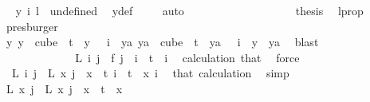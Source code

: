 \begin{isabellebody}
\ \isamarkupfalse%
\ {\isachardoublequoteopen}y\ i\ l\ {\isacharequal}{\kern0pt}\ undefined{\isachardoublequoteclose}\ \isamarkupfalse%
\ y{\isacharunderscore}{\kern0pt}def\ \isamarkupfalse%
\ {}\ \isamarkupfalse%
\ auto\isanewline
\ \ \ \ \ \ \ \ \ \ \ \ \ \ \ \ \isamarkupfalse%
\ \isamarkupfalse%
\ {\isacharquery}{\kern0pt}thesis\ \isamarkupfalse%
\ l{\isacharunderscore}{\kern0pt}prop\ \isamarkupfalse%
\ presburger\isanewline
\ \ \ \ \ \ \ \ \ \ \ \ \ \ \isamarkupfalse%
\isanewline
\ \ \ \ \ \ \ \ \ \ \ \ \isamarkupfalse%
\isanewline
\ \ \ \ \ \ \ \ \ \ \ \ \isamarkupfalse%
\ \isamarkupfalse%
\ {\isachardoublequoteopen}{\isasymexists}y{\isachardot}{\kern0pt}\ {\isacharparenleft}{\kern0pt}y\ {\isasymin}\ cube\ {}\ t\ {\isasymand}\ y\ {}\ {\isacharequal}{\kern0pt}\ i{\isacharparenright}{\kern0pt}\ {\isasymand}\ {\isacharparenleft}{\kern0pt}{\isasymforall}ya{\isachardot}{\kern0pt}\ ya\ {\isasymin}\ cube\ {}\ t\ {\isasymand}\ ya\ {}\ {\isacharequal}{\kern0pt}\ i\ {\isasymlongrightarrow}\ y\ {\isacharequal}{\kern0pt}\ ya{\isacharparenright}{\kern0pt}{\isachardoublequoteclose}\ \isamarkupfalse%
\ blast\isanewline
\isanewline
\ \ \ \ \ \ \ \ \ \ \isamarkupfalse%
\isanewline
\ \ \ \ \ \ \ \ \ \ \isamarkupfalse%
\ \isamarkupfalse%
\ {\isachardoublequoteopen}L\ i\ j\ {\isacharequal}{\kern0pt}\ f\ j{\isachardoublequoteclose}\ \ {\isachardoublequoteopen}i\ {\isacharless}{\kern0pt}\ t{\isachardoublequoteclose}\ \ i\ \isamarkupfalse%
\ calculation\ that\ \isamarkupfalse%
\ force\isanewline
\ \ \ \ \ \ \ \ \ \ \isamarkupfalse%
\ \isamarkupfalse%
\ \ {\isachardoublequoteopen}L\ i\ j\ {\isacharequal}{\kern0pt}\ L\ x\ j{\isachardoublequoteclose}\ \ {\isachardoublequoteopen}x\ {\isacharless}{\kern0pt}\ t{\isachardoublequoteclose}\ {\isachardoublequoteopen}i\ {\isacharless}{\kern0pt}\ t{\isachardoublequoteclose}\ \ x\ i\ \isamarkupfalse%
\ that\ calculation\ \isamarkupfalse%
\ simp\isanewline
\ \ \ \ \ \ \ \ \ \ \isamarkupfalse%
\ \isamarkupfalse%
\ {\isachardoublequoteopen}L{\isacharprime}{\kern0pt}\ x\ j\ {\isacharequal}{\kern0pt}\ L\ x\ j{\isachardoublequoteclose}\ \ {\isachardoublequoteopen}x\ {\isacharless}{\kern0pt}\ t{\isachardoublequoteclose}\ \ x\ \isamarkupfalse%

\end{isabellebody}
